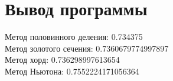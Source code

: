 \documentclass[a4paper]{article}
\begin{document}
 







% 

\section{Вывод программы}
Метод половинного деления: 0.734375 \\
Метод золотого сечения: 0.7360679774997897 \\
Метод хорд: 0.736298997613654 \\
Метод Ньютона: 0.7552224171056364 \\
\end{document}
